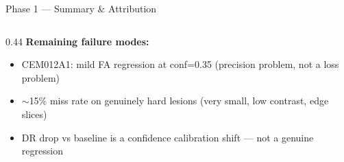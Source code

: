 \documentclass[aspectratio=169, 10pt]{beamer}
\begin{document}
\begin{frame}{Phase 1 — Summary \& Attribution}
\begin{columns}[T]
\begin{column}{0.44\textwidth}
      \vspace{8pt}
      \textbf{Remaining failure modes:}
      \begin{itemize}\scriptsize
        \item CEM012A1: mild FA regression at conf=0.35 (precision problem, not a loss problem)
        \item $\sim$15\% miss rate on genuinely hard lesions (very small, low contrast, edge slices)
        \item DR drop vs baseline is a confidence calibration shift — not a genuine regression
      \end{itemize}
    \end{column}
  \end{columns}
\end{frame}
\end{document}
